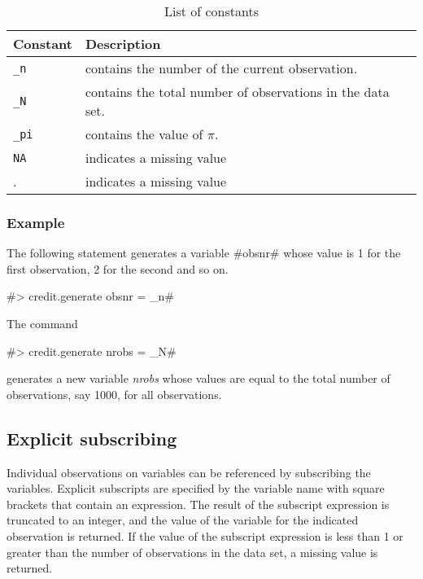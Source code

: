 \begin{table}[ht]
\begin{center}
\begin{tabular}{|l|l|}
\hline
Constant & Description \\
\hline \hline
\texttt{\_n} & contains the number of the current observation.  \\
\texttt{\_N }& contains the total number of observations in the data set. \\
\texttt{\_pi} & contains the value of $\pi$. \\
\texttt{NA} & indicates a missing value \\
.  & indicates a missing value \\

\hline
\end{tabular}
{\em \caption{\label{constant} List of constants}}
\end{center}
\end{table}


\subsubsection*{Example}

The following statement generates a variable #obsnr# whose value
is 1 for the first observation, 2 for the second and so on.

#> credit.generate obsnr = _n#

The command

#> credit.generate nrobs = _N#

generates a new variable {\em nrobs} whose values are equal to the
total number of observations, say 1000, for all observations.

\subsection{Explicit subscribing}
 

Individual observations on variables can be referenced by
subscribing the variables. Explicit subscripts are specified by
the variable name with square brackets that contain an expression.
The result of the subscript expression is truncated to an integer,
and the value of the variable for the indicated observation is
returned. If  the value of the subscript expression is less than 1
or greater than the number of observations in the data set,
a missing value is returned.

